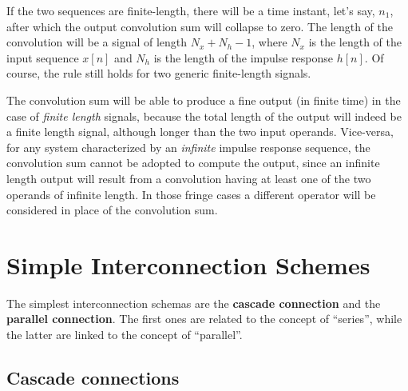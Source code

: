 \documentclass[\documentfontsize, twocolumn]{\classname}
\begin{document}
If the two sequences are finite-length, there will be a time instant, let's say, $n_1$, after which the output convolution sum will collapse to zero. The length of the convolution will be a signal of length $N_x + N_h - 1$, where $N_x$ is the length of the input sequence $x[n]$ and $N_h$ is the length of the impulse response $h[n]$. Of course, the rule still holds for two generic finite-length signals.

The convolution sum will be able to produce a fine output (in finite time) in the case of \emph{finite length} signals, because the total length of the output will indeed be a finite length signal, although longer than the two input operands. Vice-versa, for any system characterized by an \emph{infinite} impulse response sequence, the convolution sum cannot be adopted to compute the output, since an infinite length output will result from a convolution having at least one of the two operands of infinite length. In those fringe cases a different operator will be considered in place of the convolution sum.

\section{Simple Interconnection Sche\-mes}

The simplest interconnection schemas are the \textbf{cascade connection} and the \textbf{parallel connection}. The first ones are related to the concept of ``series'', while the latter are linked to the concept of ``parallel''.

\subsection{Cascade connections}
\end{document}
